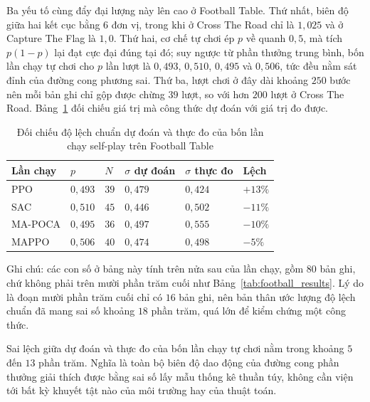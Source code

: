 \indent Ba yếu tố cùng đẩy đại lượng này lên cao ở Football Table. Thứ nhất, biên độ giữa hai
kết cục bằng $6$ đơn vị, trong khi ở Cross The Road chỉ là $1{,}025$ và ở Capture The Flag là
$1{,}0$. Thứ hai, cơ chế tự chơi ép $p$ về quanh $0{,}5$, mà tích $p(1-p)$ lại đạt cực đại
đúng tại đó; suy ngược từ phần thưởng trung bình, bốn lần chạy tự chơi cho $p$ lần lượt là
$0{,}493$, $0{,}510$, $0{,}495$ và $0{,}506$, tức đều nằm sát đỉnh của đường cong phương sai.
Thứ ba, lượt chơi ở đây dài khoảng $250$ bước nên mỗi bản ghi chỉ gộp được chừng $39$ lượt, so
với hơn $200$ lượt ở Cross The Road. Bảng~\ref{tab:football_variance} đối chiếu giá trị mà
công thức dự đoán với giá trị đo được.

\begin{table}[H]
\centering
\caption{Đối chiếu độ lệch chuẩn dự đoán và thực đo của bốn lần chạy self-play trên
Football Table}
\label{tab:football_variance}
\renewcommand{\arraystretch}{1.35}
\tablefont
\setlength{\tabcolsep}{4pt}
\begin{tabular}{|p{4.3cm}|>{\centering\arraybackslash}p{1.5cm}
                |>{\centering\arraybackslash}p{1.3cm}
                |>{\centering\arraybackslash}p{2.05cm}
                |>{\centering\arraybackslash}p{2.05cm}
                |>{\centering\arraybackslash}p{1.5cm}|}
\hline
\textbf{Lần chạy} & \textbf{$p$} & \textbf{$N$} & \textbf{$\sigma$ dự đoán} & \textbf{$\sigma$ thực đo} & \textbf{Lệch} \\
\hline
PPO & $0{,}493$ & $39$ & $0{,}479$ & $0{,}424$ & $+13\%$ \\
\hline
SAC & $0{,}510$ & $45$ & $0{,}446$ & $0{,}502$ & $-11\%$ \\
\hline
MA-POCA & $0{,}495$ & $36$ & $0{,}497$ & $0{,}555$ & $-10\%$ \\
\hline
MAPPO & $0{,}506$ & $40$ & $0{,}474$ & $0{,}498$ & $-5\%$ \\
\hline
\end{tabular}

\vspace{0.15cm}
{\footnotesize Ghi chú: các con số ở bảng này tính trên nửa sau của lần chạy, gồm $80$ bản
ghi, chứ không phải trên mười phần trăm cuối như Bảng~\ref{tab:football_results}. Lý do là
đoạn mười phần trăm cuối chỉ có $16$ bản ghi, nên bản thân ước lượng độ lệch chuẩn đã mang
sai số khoảng $18$ phần trăm, quá lớn để kiểm chứng một công thức.}
\end{table}

\indent Sai lệch giữa dự đoán và thực đo của bốn lần chạy tự chơi nằm trong khoảng $5$ đến
$13$ phần trăm. Nghĩa là toàn bộ biên độ dao động của đường cong phần thưởng giải thích được
bằng sai số lấy mẫu thống kê thuần túy, không cần viện tới bất kỳ khuyết tật nào của môi
trường hay của thuật toán.

